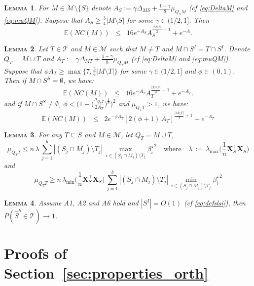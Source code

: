 \documentclass[aos]{imsart}
\theoremstyle{plain}
\newtheorem{lem}{\textsc{Lemma}}[section]
\newcommand{\E}{\mathbb{E}}
\newcommand{\bs}{\boldsymbol}
\begin{document}
\begin{supplement}
\begin{lem}\label{lem:boundexpnc} For $M\in \mathcal{M}\setminus \{S\}$ denote $A_S:=\gamma\Delta_{MS}+\tfrac{1-\gamma}{8}\mu_{Q_SM}$ (cf \eqref{eq:DeltaM} and \eqref{eq:muQM}). Suppose that $A_S\geq \frac{3}{4}|M\setminus S|$ for some $\gamma \in (1/2,1]$. Then
$$\E\left(NC(M)\right)  \;\;\leq\;\;  16
e^{-A_S}A_S^{\frac{|M\setminus S|}{2}+1} + e^{-A}.$$
\end{lem}

\begin{lem}\label{lem:boundexpnc2} Let $T\in\mathcal{T}$ and $M\in \mathcal{M}$ such that $M\neq T$ and $M\cap S^I=T\cap S^I$. Denote $Q_T= M\cup T$ and
$A_T:=\gamma\Delta_{MT}+\tfrac{1-\gamma}{8}\mu_{Q_TM}$ (cf \eqref{eq:DeltaM} and \eqref{eq:muQM}). Suppose that $\phi A_T\geq \max\{7,\frac{3}{4}|M\setminus T|\}$ for some $\gamma \in (1/2,1]$ and $\phi \in (0,1)$. Then if $M \cap S^S = \emptyset$, we have:
$$\E\left(NC(M)\right)  \;\;\leq\;\;  16
e^{-A_T}A_T^{\frac{|M\setminus S|}{2}+1} + e^{-A_T}.$$
and if $M \cap S^S\neq\emptyset$, $\phi < \Big(1-\big(\frac{\mu_{Q_TT}}{2A_T}\big)^{\frac{1}{3}}\Big)^2$ and $\mu_{Q_TT}>1$, we have:
$$\E\left(NC(M)\right)  \;\;\leq\;\;  2e^{-\phi A_T}[2(\phi+1)\,A_T]^{\frac{|M\setminus T|}{4}+1}+ e^{-A_T}$$

\end{lem}

\begin{lem}\label{lem:upperboundnoncentralgen}
    For any $T\subseteq S$ and $M\in \mathcal{M}$, let $Q_T=M\cup T$, $$\mu_{Q_TT} \leq n\,\bar{\lambda}\,\sum_{j=1}^b|(S_j\cap M_j )\setminus T_j|\,\max_{i\in (S_j\cap M_j )\setminus T_j}{\beta_{i}^{\star}}^2 \quad \text{where}\quad \bar{\lambda}\,:=\,\lambda_{\max}\Big(\frac1n \bs X_{S}^\top\bs X_{S}\Big)$$
    and
    $$\mu_{Q_TT} \geq n\,\lambda_{\min}\Big(\frac1n \bs X_{S}^\top\bs X_{S}\Big)\,\sum_{j=1}^b|(S_j\cap M_j )\setminus T_j|\,\min_{i\in (S_j\cap M_j )\setminus T_j}{\beta_{i}^{\star}}^2$$
\end{lem}

\begin{lem}\label{lem:convtoTprob}
    Assume A1, A2 and A6 hold and $|S^I|=O(1)$ (cf \eqref{eq:defslsi}), then $P(\hat{S}^b \in \mathcal{T})\to 1$.
\end{lem}


\section{Proofs of Section~\ref{sec:properties_orth}}



\end{supplement}
\end{document}
